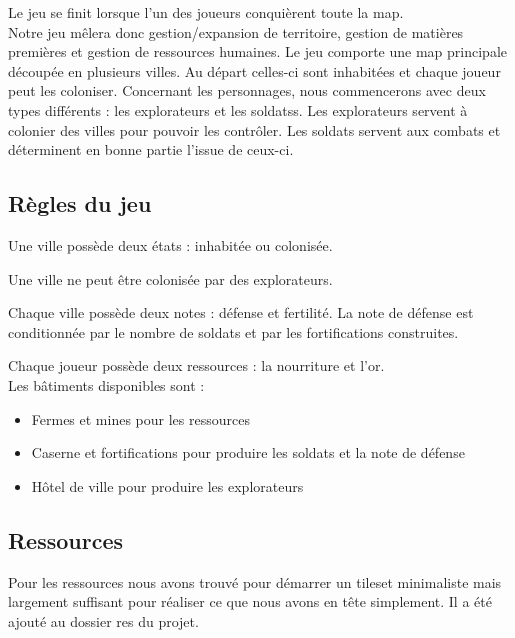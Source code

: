 \documentclass[a4paper,12pt]{article}
\begin{document}
Le jeu se finit lorsque l'un des joueurs conquièrent toute la map.
\\

Notre jeu mêlera donc gestion/expansion de territoire, gestion de matières premières et gestion de ressources humaines.
Le jeu comporte une map principale découpée en plusieurs villes. Au départ celles-ci sont inhabitées et chaque joueur peut les coloniser. Concernant les personnages, nous commencerons avec deux types différents : les explorateurs et les soldatss. Les explorateurs servent à colonier des villes pour pouvoir les contrôler. Les soldats servent aux combats et déterminent en bonne partie l'issue de ceux-ci.


\subsection{Règles du jeu}

\vspace{1\baselineskip}


Une ville possède deux états : inhabitée ou colonisée. 

Une ville ne peut être colonisée par des explorateurs.

Chaque ville possède deux notes : défense et fertilité. La note de défense est conditionnée par le nombre de soldats et par les fortifications construites. 

Chaque joueur possède deux ressources : la nourriture et l'or.
\\

Les bâtiments disponibles sont : \begin{itemize}

\item Fermes et mines pour les ressources

\item Caserne et fortifications pour produire les soldats et la note de défense

\item Hôtel de ville pour produire les explorateurs

\end{itemize}

\subsection{Ressources}

\vspace{1\baselineskip}


Pour les ressources nous avons trouvé pour démarrer un tileset minimaliste mais largement suffisant pour réaliser ce que nous avons en tête simplement. Il a été ajouté au dossier res du projet.
\\
\end{document}
